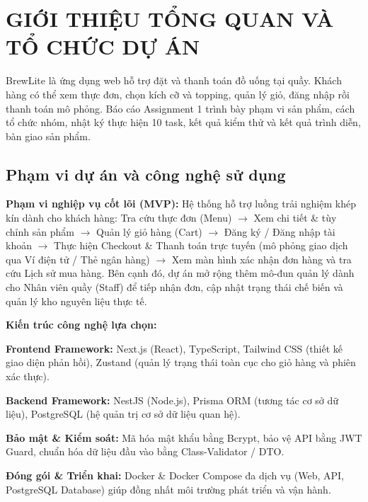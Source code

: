 \documentclass[12pt,a4paper]{report}
\begin{document}
\begingroup\singlespacing\small\tableofcontents\endgroup

\clearpage


\chapter{GIỚI THIỆU TỔNG QUAN VÀ TỔ CHỨC DỰ ÁN}

BrewLite là ứng dụng web hỗ trợ đặt và thanh toán đồ uống tại quầy. Khách hàng có thể xem thực đơn, chọn kích cỡ và topping, quản lý giỏ, đăng nhập rồi thanh toán mô phỏng. Báo cáo Assignment 1 trình bày phạm vi sản phẩm, cách tổ chức nhóm, nhật ký thực hiện 10 task, kết quả kiểm thử và kết quả trình diễn, bàn giao sản phẩm.


\section{Phạm vi dự án và công nghệ sử dụng}

\textbf{Phạm vi nghiệp vụ cốt lõi (MVP):} Hệ thống hỗ trợ luồng trải nghiệm khép kín dành cho khách hàng: Tra cứu thực đơn (Menu) \ensuremath{\rightarrow} Xem chi tiết \& tùy chỉnh sản phẩm \ensuremath{\rightarrow} Quản lý giỏ hàng (Cart) \ensuremath{\rightarrow} Đăng ký / Đăng nhập tài khoản \ensuremath{\rightarrow} Thực hiện Checkout \& Thanh toán trực tuyến (mô phỏng giao dịch qua Ví điện tử / Thẻ ngân hàng) \ensuremath{\rightarrow} Xem màn hình xác nhận đơn hàng và tra cứu Lịch sử mua hàng. Bên cạnh đó, dự án mở rộng thêm mô-đun quản lý dành cho Nhân viên quầy (Staff) để tiếp nhận đơn, cập nhật trạng thái chế biến và quản lý kho nguyên liệu thực tế.


\textbf{Kiến trúc công nghệ lựa chọn:}


\textbf{Frontend Framework: }Next.js (React), TypeScript, Tailwind CSS (thiết kế giao diện phản hồi), Zustand (quản lý trạng thái toàn cục cho giỏ hàng và phiên xác thực).


\textbf{Backend Framework: }NestJS (Node.js), Prisma ORM (tương tác cơ sở dữ liệu), PostgreSQL (hệ quản trị cơ sở dữ liệu quan hệ).


\textbf{Bảo mật \& Kiểm soát: }Mã hóa mật khẩu bằng Bcrypt, bảo vệ API bằng JWT Guard, chuẩn hóa dữ liệu đầu vào bằng Class-Validator / DTO.


\textbf{Đóng gói \& Triển khai: }Docker \& Docker Compose đa dịch vụ (Web, API, PostgreSQL Database) giúp đồng nhất môi trường phát triển và vận hành.
\end{document}
